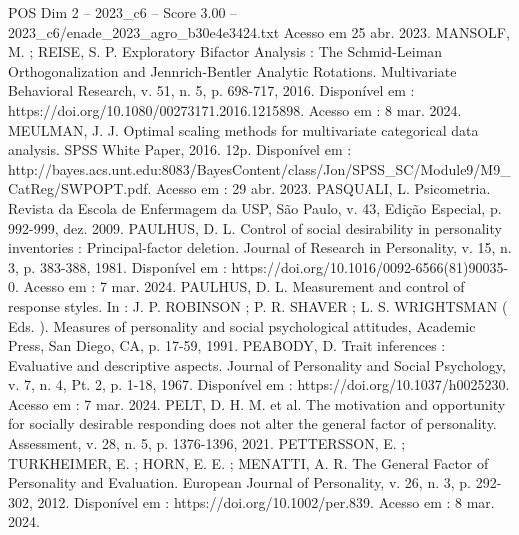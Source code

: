 \begin{textsample}{POS Dim 2 – 2023\_c6 – Score 3.00 – 2023\_c6/enade\_2023\_agro\_b30e4e3424.txt}
Acesso em 25 abr. 2023.
MANSOLF, M. ; REISE, S.
P.
Exploratory Bifactor Analysis : The Schmid-Leiman Orthogonalization and Jennrich-Bentler Analytic Rotations.
Multivariate Behavioral Research, v. 51, n. 5, p. 698-717, 2016.
Disponível em : https://doi.org/10.1080/00273171.2016.1215898.
Acesso em : 8 mar. 2024.
MEULMAN, J.
J.
Optimal scaling methods for multivariate categorical data analysis.
SPSS White Paper, 2016. 12p.
Disponível em : http://bayes.acs.unt.edu:8083/BayesContent/class/Jon/SPSS\_SC/Module9/M9\_CatReg/SWPOPT.pdf.
Acesso em : 29 abr. 2023.
PASQUALI, L.
Psicometria.
Revista da Escola de Enfermagem da USP, São Paulo, v. 43, Edição Especial, p. 992-999, dez. 2009.
PAULHUS, D.
L.
Control of social desirability in personality inventories : Principal-factor deletion.
Journal of Research in Personality, v. 15, n. 3, p. 383-388, 1981.
Disponível em : https://doi.org/10.1016/0092-6566(81)90035-0.
Acesso em : 7 mar. 2024.
PAULHUS, D.
L.
Measurement and control of response styles.
In : J.
P.
ROBINSON ; P.
R.
SHAVER ; L.
S.
WRIGHTSMAN ( Eds. ).
Measures of personality and social psychological attitudes, Academic Press, San Diego, CA, p. 17-59, 1991.
PEABODY, D.
Trait inferences : Evaluative and descriptive aspects.
Journal of Personality and Social Psychology, v. 7, n. 4, Pt. 2, p. 1-18, 1967.
Disponível em : https://doi.org/10.1037/h0025230.
Acesso em : 7 mar. 2024.
PELT, D.
H.
M. et al.
The motivation and opportunity for socially desirable responding does not alter the general factor of personality.
Assessment, v. 28, n. 5, p. 1376-1396, 2021.
PETTERSSON, E. ; TURKHEIMER, E. ; HORN, E.
E. ; MENATTI, A.
R.
The General Factor of Personality and Evaluation.
European Journal of Personality, v. 26, n. 3, p. 292-302, 2012.
Disponível em : https://doi.org/10.1002/per.839.
Acesso em : 8 mar. 2024.

\end{textsample}
